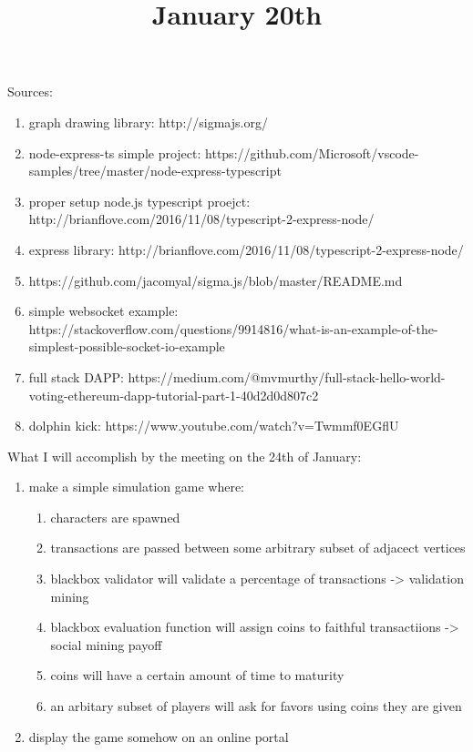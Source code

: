 Sources:

\begin{enumerate}
	\item graph drawing library: http://sigmajs.org/
	\item node-express-ts simple project: https://github.com/Microsoft/vscode-samples/tree/master/node-express-typescript
	\item proper setup node.js typescript proejct: http://brianflove.com/2016/11/08/typescript-2-express-node/
	\item express library: http://brianflove.com/2016/11/08/typescript-2-express-node/
	\item https://github.com/jacomyal/sigma.js/blob/master/README.md
	\item simple websocket example: https://stackoverflow.com/questions/9914816/what-is-an-example-of-the-simplest-possible-socket-io-example
	\item full stack DAPP: https://medium.com/@mvmurthy/full-stack-hello-world-voting-ethereum-dapp-tutorial-part-1-40d2d0d807c2
	\item dolphin kick: https://www.youtube.com/watch?v=Twmmf0EGflU
\end{enumerate}

\title{January 20th}


What I will accomplish by the meeting on the 24th of January:

\begin{enumerate}
	\item make a simple simulation game where:
		\begin{enumerate}
			\item characters are spawned
			\item transactions are passed between some arbitrary subset of adjacect vertices
			\item blackbox validator will validate a percentage of transactions  -> validation mining
			\item blackbox evaluation function will assign coins to faithful transactiions -> social mining payoff
			\item coins will have a certain amount of time to maturity
			\item an arbitary subset of players will ask for favors using coins they are given
		\end{enumerate}
	\item display the game somehow on an online portal
\end{enumerate}

